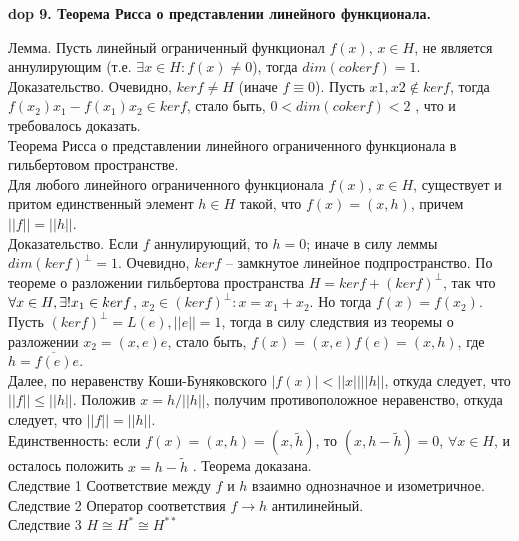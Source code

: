 \textbf{\LARGE dop 9. Теорема Рисса о представлении линейного функционала.}

Лемма. Пусть линейный ограниченный функционал $f(x)$, $x \in H$, не является
аннулирующим (т.е. $ \exists x \in H : f(x) \neq 0$), тогда $dim (coker f) = 1$.\\
Доказательство. Очевидно, $ ker f \neq H$ (иначе $f \equiv 0$). Пусть $x1, x2 \not\in ker f$, тогда\\
$f(x_{2})x_{1} - f(x_{1})x_{2} \in ker f$, стало быть, $0 < dim(coker f) < 2$
, что и требовалось доказать.\\

Теорема Рисса о представлении линейного ограниченного функционала в
гильбертовом пространстве.\\
Для любого линейного ограниченного функционала $f(x)$, $x \in H$,
существует и притом единственный элемент $h \in H$ такой, что $f(x)= (x, h)$, причем $||f|| = ||h||$.\\

Доказательство. Если $f$ аннулирующий, то $h = 0$; иначе в силу леммы
$dim(ker f)^{\perp} = 1$. Очевидно, $ker f$ – замкнутое линейное подпространство. По теореме о
разложении гильбертова пространства $H = ker f + (ker f)^{\perp}$, так что $\forall x \in H, \exists! \space x_{1} \in ker f$,
$x_{2} \in (ker f)^{\perp} : x = x_{1} + x_{2}$. Но тогда $f(x) = f(x_{2})$. Пусть $(ker f)^{\perp} = L(e), ||e|| = 1$, тогда в силу следствия из теоремы о разложении $x_{2} = (x, e)e$, стало быть, $f(x) = (x,e)f(e) = (x, h)$, где $h = \overline{f(e)} e$.\\
Далее, по неравенству Коши-Буняковского $|f(x)| < ||x|| ||h||$, откуда следует, что $||f|| \leq ||h||$. Положив $x = h / ||h||$, получим противоположное неравенство, откуда следует, что $||f|| = ||h||$.\\
Единственность: если $f(x) = (x, h) = (x, \tilde h)$, то $(x, h - \tilde h) = 0$, $\forall x \in H$, и осталось положить $x = h - \tilde h$ . Теорема доказана.\\

Следствие 1 Соответствие между $f$ и $h$ взаимно однозначное и изометричное.\\
Следствие 2 Оператор соответствия $f \rightarrow h$ антилинейный.\\
Следствие 3 $H \cong H^{*} \cong H^{**}$
